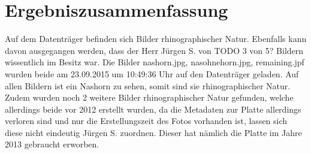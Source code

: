 \chapter{Ergebniszusammenfassung}

Auf dem Datenträger befinden sich Bilder rhinographischer Natur. Ebenfalls kann davon ausgegangen werden, dass der Herr Jürgen S. von TODO 3 von 5? Bildern wissentlich im Besitz war. Die Bilder nashorn.jpg, nasohnehorn.jpg, remaining.jpf wurden beide am 23.09.2015 um 10:49:36 Uhr auf den Datenträger geladen. Auf allen Bildern ist ein Nashorn zu sehen, somit sind sie rhinographischer Natur. Zudem wurden noch 2 weitere Bilder rhinographischer Natur gefunden, welche allerdings beide vor 2012 erstellt wurden, da die Metadaten zur Platte allerdings verloren sind und nur die Erstellungszeit des Fotos vorhanden ist, lassen sich diese nicht eindeutig Jürgen S. zuordnen. Dieser hat nämlich die Platte im Jahre 2013 gebraucht erworben.